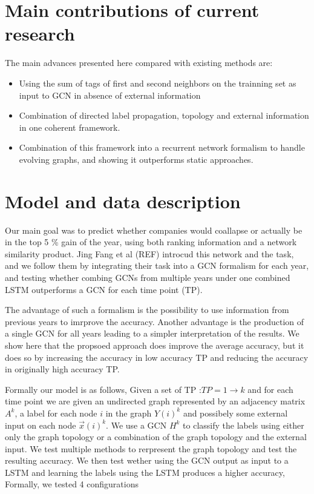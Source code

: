 \section{Main contributions of current research}
The main  advances presented here compared with existing methods are:
\begin{itemize}
\item Using the sum of tags of first and second neighbors on the trainning set as input to GCN in absence of external information
\item Combination of directed label propagation, topology and external information in one coherent framework.
\item Combination of this framework into a recurrent network formalism to handle evolving graphs, and showing it outperforms static approaches. 
\end{itemize}
\section{Model and data description}
Our main goal was to predict whether companies would coallapse or actually be in the top 5 \% gain of the year, using both ranking information and a network similarity product. Jing Fang et al (REF) introcud this network and the task, and we follow them by integrating their task into a GCN formalism for each year, and testing whether combing GCNs from multiple years under one combined LSTM outperforms a GCN for each time point (TP).

The advantage of such a formalism is the possibility to use information from previous years to imrprove the accuracy. Another advantage is the production of a single GCN for all years leading to a simpler interpretation of the results. We show here that the propsoed approach does improve the average accuracy, but it does so by increasing the accuracy in low accuracy TP and reducing the accuracy in originally high accuracy TP. 

Formally our model is as follows, Given a set of TP :$TP=1 \to k$ and for each time point we are given an undirected graph represented by an adjacency matrix $A^k$, a label for each node $i$ in the graph $Y(i)^k$ and possibely some external input on each node $\vec{x}(i)^k$. We use a GCN $H^k$ to classify the labels using either only the graph topology or a combination of the graph topology and the external input. We test multiple methods to rerpresent the graph topology and test the resulting accuracy. We then test wether using the GCN output as input to a LSTM and learning the labels using the LSTM produces a higher accuracy, Formally, we tested 4 configurations 


